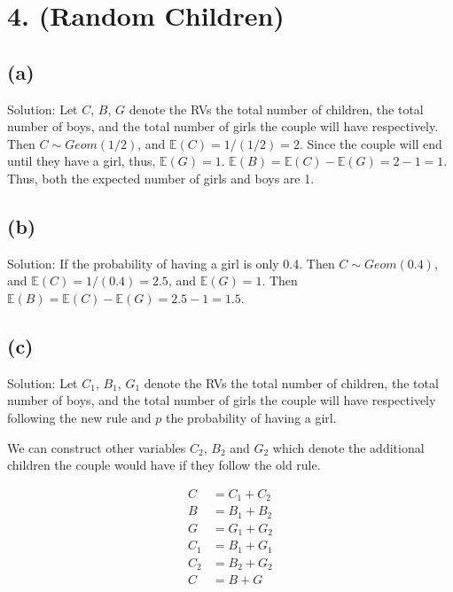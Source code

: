 \documentclass[10pt]{537homework}
\author{Peilun Dai}
\begin{document}
\section*{4. (Random Children) }


\subsection*{(a)}

Solution: Let $C$, $B$, $G$ denote the RVs the total number of children, the total number of boys, and the total number of girls the couple will have respectively. Then $C \sim Geom(1/2)$, and $\mathbb{E}(C) = 1/(1/2) = 2$. Since the couple will end until they have a girl, thus, $\mathbb{E}(G) = 1$. $\mathbb{E}(B) = \mathbb{E}(C) - \mathbb{E}(G) = 2 - 1 = 1$. Thus, both the expected number of girls and boys are 1. 



\subsection*{(b)}

Solution: If the probability of having a girl is only 0.4. Then $C \sim Geom(0.4)$, and $\mathbb{E}(C) = 1/(0.4) = 2.5$, and $\mathbb{E}(G) = 1$. Then $\mathbb{E}(B) = \mathbb{E}(C) - \mathbb{E}(G) = 2.5 - 1 = 1.5$. 



\subsection*{(c)}

Solution: Let $C_1$, $B_1$, $G_1$ denote the RVs the total number of children, the total number of boys, and the total number of girls the couple will have respectively following the new rule and $p$ the probability of having a girl. 

We can construct other variables $C_2$, $B_2$ and $G_2$ which denote the additional children the couple would have if they follow the old rule. 

\begin{align}
  C   & = C_1 + C_2 \\
  B   & = B_1 + B_2 \\
  G   & = G_1 + G_2 \\
  C_1 & = B_1 + G_1 \\
  C_2 & = B_2 + G_2 \\
  C   & = B + G
\end{align}
\end{document}
